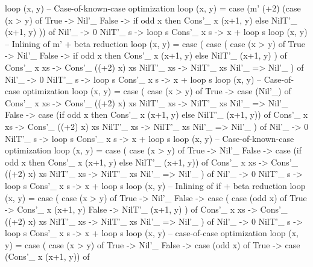 \begin{spec}
loop (x, y)
-- Case-of-known-case optimization
loop (x, y) = case (m' (+2) (case (x > y) of
    True -> Nil'_
    False -> if odd x then Cons'_ x (x+1, y) else NilT'_ (x+1, y)
  )) of
  Nil'_ -> 0
  NilT'_ s -> loop s
  Cons'_ x s -> x + loop s
loop (x, y)
-- Inlining of m' + beta reduction
loop (x, y) = case (
                case (
                  case (x > y) of
                    True -> Nil'_
                    False -> if odd x then Cons'_ x (x+1, y) else NilT'_ (x+1, y)
                ) of
                  Cons'_ x xs -> Cons'_ ((+2) x) xs
                  NilT'_ xs -> NilT'_ xs
                  Nil'_ => Nil'_
              ) of
                Nil'_ -> 0
                NilT'_ s -> loop s
                Cons'_ x s -> x + loop s
loop (x, y)
-- Case-of-case optimization
loop (x, y) = case (
                case (x > y) of
                  True -> case (Nil'_) of
                    Cons'_ x xs -> Cons'_ ((+2) x) xs
                    NilT'_ xs -> NilT'_ xs
                    Nil'_ => Nil'_
                  False -> case (if odd x then Cons'_ x (x+1, y) else NilT'_ (x+1, y)) of
                    Cons'_ x xs -> Cons'_ ((+2) x) xs
                    NilT'_ xs -> NilT'_ xs
                    Nil'_ => Nil'_
              ) of
                Nil'_ -> 0
                NilT'_ s -> loop s
                Cons'_ x s -> x + loop s
loop (x, y)
-- Case-of-known-case optimization
loop (x, y) = case (
                case (x > y) of
                  True -> Nil'_
                  False -> case (if odd x then Cons'_ x (x+1, y) else NilT'_ (x+1, y)) of
                    Cons'_ x xs -> Cons'_ ((+2) x) xs
                    NilT'_ xs -> NilT'_ xs
                    Nil'_ => Nil'_
              ) of
                Nil'_ -> 0
                NilT'_ s -> loop s
                Cons'_ x s -> x + loop s
loop (x, y)
-- Inlining of if + beta reduction
loop (x, y) = case (
                case (x > y) of
                  True -> Nil'_
                  False -> case (
                    case (odd x) of
                      True -> Cons'_ x (x+1, y) 
                      False -> NilT'_ (x+1, y)
                  ) of
                    Cons'_ x xs -> Cons'_ ((+2) x) xs
                    NilT'_ xs -> NilT'_ xs
                    Nil'_ => Nil'_
              ) of
                Nil'_ -> 0
                NilT'_ s -> loop s
                Cons'_ x s -> x + loop s
loop (x, y)
-- case-of-case optimization
loop (x, y) = case (
                case (x > y) of
                  True -> Nil'_
                  False ->  case (odd x) of
                    True -> case (Cons'_ x (x+1, y)) of

\end{spec}
